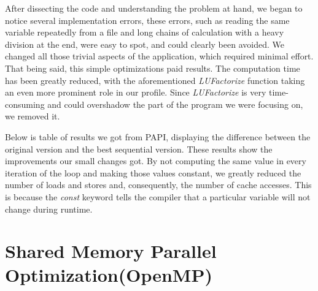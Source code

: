 \documentclass[a4paper,10pt,openright,openbib,twocolumn]{article}
\begin{document}
After dissecting the code and understanding the problem at hand, we began to notice several implementation errors, these errors, such as reading the same variable repeatedly from a file and long chains of calculation with a heavy division at the end, were easy to spot, and could clearly been avoided. We changed all those trivial aspects of the application, which required minimal effort. That being said, this simple optimizations paid results. The computation time has been greatly reduced, with the aforementioned \emph{LUFactorize} function taking an even more prominent role in our profile. Since \emph{LUFactorize} is very time-consuming and could overshadow the part of the program we were focusing on, we removed it.

Below is table of results we got from PAPI, displaying the difference between the original version and the best sequential version. 
These results show the improvements our small changes got. By not computing the same value in every iteration of the loop and making those values constant, we greatly reduced the number of loads and stores and, consequently, the number of cache accesses. This is because the \emph{const} keyword tells the compiler that a particular variable will not change during runtime.  

\begin{table}[!htp]
    \caption{PAPI comparison}
    \label{tab:testcases}
\end{table}

\section{Shared Memory Parallel Optimization(OpenMP)}
\end{document}
